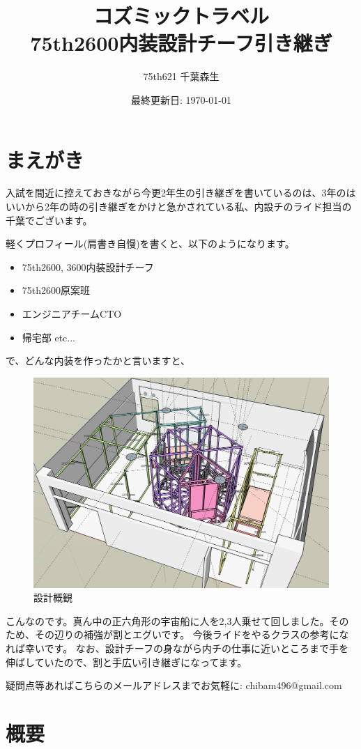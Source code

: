 \documentclass{jsarticle}
\title{
    コズミックトラベル \\
    \large 75th2600内装設計チーフ引き継ぎ
}
\author{75th621 千葉森生}
\date{最終更新日: \today}
\begin{document}
\maketitle

\section{まえがき}

入試を間近に控えておきながら今更2年生の引き継ぎを書いているのは、3年のはいいから2年の時の引き継ぎをかけと急かされている私、内設チのライド担当の千葉でございます。

軽くプロフィール(肩書き自慢)を書くと、以下のようになります。
\begin{itemize}
    \item 75th2600, 3600内装設計チーフ
    \item 75th2600原案班
    \item エンジニアチームCTO
    \item 帰宅部 etc...
\end{itemize}

で、どんな内装を作ったかと言いますと、

\begin{figure}[htbp]
    \centering
    \includegraphics[width=0.5\linewidth]{images/plan_overview/1.png}
    \caption{設計概観}
    \label{fig:設計概観}
\end{figure}

こんなのです。真ん中の正六角形の宇宙船に人を2,3人乗せて回しました。そのため、その辺りの補強が割とエグいです。
今後ライドをやるクラスの参考になれば幸いです。
なお、設計チーフの身ながら内チの仕事に近いところまで手を伸ばしていたので、割と手広い引き継ぎになってます。

疑問点等あればこちらのメールアドレスまでお気軽に:  chibam496@gmail.com

\clearpage

\tableofcontents
\clearpage

\section{概要}
\end{document}
